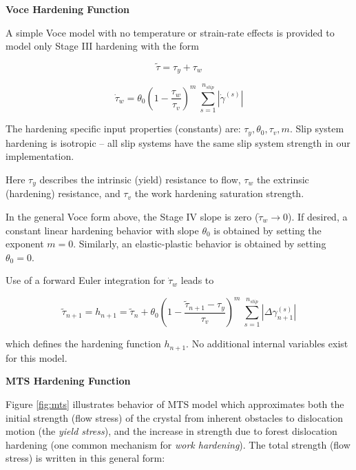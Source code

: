 \documentclass[11pt]{report}
\numberwithin{equation}{section}
\newcommand{\ti}{\emph}
\newcommand{\noi}{\noindent}
\begin{document}
\noi \textbf{Voce Hardening Function}

\noi 
A simple Voce model with no temperature or strain-rate effects is provided to model
only Stage III hardening with the form

\begin{equation}\label{eq:Voce-simple-a}
\tilde{\tau}=\tau_{y}+\tau_{w}
\end{equation}

\begin{equation}\label{eq:Voce-simple-b}
\dot{\tau}_{w}=\ensuremath{\theta_{0}\left(1-\frac{\tau_{w}}{\tau_{v}}
\right)^{m}\ \sum\limits _{s=1}^{n_{slip}}\left|\dot{\gamma}^{\left(s\right)}\right|}
\end{equation}

\noi The hardening specific  input properties (constants) are: $\tau_y, \theta_0, \tau_v, m$.
Slip system hardening is isotropic -- all slip
systems have the same slip system strength in our implementation.

Here $\tau_y$ describes the intrinsic (yield) resistance to flow, $\tau_w$
the extrinsic (hardening) resistance, and $\tau_v$ the work hardening saturation strength. 


In the general Voce form above, the Stage IV slope is zero ($\dot \tau_w \rightarrow 0$).
If desired, a constant linear hardening behavior with slope $\theta_0$ is obtained by setting
the exponent $m=0$. Similarly, an elastic-plastic behavior is obtained by setting
$\theta_0=0$. 


Use of a forward Euler integration for  $\dot{\tau}_{w}$ leads to
 
\begin{equation}\label{eq:Voce-simple-c}
\ensuremath{\tilde{\tau}_{n+1}=h_{n+1}=
\tilde{\tau}_{n}+\theta_{0}\left(1-\frac{\tilde{\tau}_{n+1}-\tau_{y}}{\tau_{v}}\right)^{m}\ 
\sum\limits _{s=1}^{n_{slip}}\left|\Delta\gamma_{n+1}^{\left(s\right)}\right|}
\end{equation}

\noi which defines the hardening function $h_{n+1}$.
No additional internal variables exist for this model.



\noi \textbf {MTS Hardening Function} 

\noi Figure \ref{fig:mts} illustrates behavior of  MTS model which
approximates both the initial strength (flow stress) of the crystal from 
inherent obstacles to dislocation motion (the
\ti{yield stress}), and the increase in strength due to forest dislocation
hardening (one common mechanism for \ti{work hardening}). The total strength (flow stress)
is written in this general form:
\end{document}
